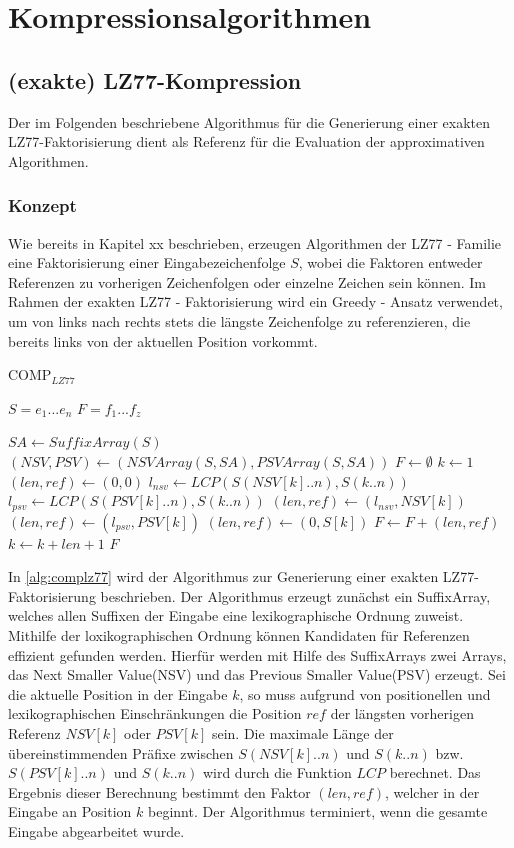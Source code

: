 \chapter{Kompressionsalgorithmen}

\section{(exakte) LZ77-Kompression}
Der im Folgenden beschriebene Algorithmus für die Generierung einer exakten LZ77-Faktorisierung dient als Referenz für die Evaluation der approximativen Algorithmen.

\subsection{Konzept}
Wie bereits in Kapitel xx beschrieben, erzeugen Algorithmen der LZ77 - Familie eine Faktorisierung einer Eingabezeichenfolge $S$, wobei die Faktoren entweder Referenzen
zu vorherigen Zeichenfolgen oder einzelne Zeichen sein können. Im Rahmen der exakten LZ77 - Faktorisierung wird ein Greedy - Ansatz verwendet, um von links nach rechts 
stets die längste Zeichenfolge zu referenzieren, die bereits links von der aktuellen Position vorkommt.
\begin{algorithm}[ht]
\centering
\caption{COMP$_{LZ77}$} \label{alg:complz77}
\algorithmicrequire $S=e_1...e_n$
\algorithmicensure $F=f_1...f_z$
\begin{algorithmic}
    \STATE $SA \gets SuffixArray(S)$
    \STATE $(NSV, PSV) \gets (NSVArray(S, SA), PSVArray(S, SA))$
    \STATE $F \gets \emptyset$
    \STATE $k \gets 1$
    \STATE $(len, ref) \gets (0, 0)$
    \STATE $l_{nsv} \gets LCP(S(NSV[k]..n), S(k..n))$
    \STATE $l_{psv} \gets LCP(S(PSV[k]..n), S(k..n))$
        \STATE $(len, ref) \gets (l_{nsv}, NSV[k])$
        \STATE $(len, ref) \gets (l_{psv}, PSV[k])$
    \ELSE
        \STATE $(len, ref) \gets (0, S[k])$
    \ENDIF
    \STATE $F \gets F + (len, ref)$
    \STATE $k \gets k + len + 1$
    \ENDWHILE
    \RETURN $F$
\end{algorithmic}
\end{algorithm}
In \ref{alg:complz77} wird der Algorithmus zur Generierung einer exakten LZ77-Faktorisierung beschrieben. Der Algorithmus erzeugt zunächst ein SuffixArray, welches allen
Suffixen der Eingabe eine lexikographische Ordnung zuweist. Mithilfe der loxikographischen Ordnung können Kandidaten für Referenzen effizient gefunden werden. Hierfür 
werden mit Hilfe des SuffixArrays zwei Arrays, das Next Smaller Value(NSV) und das Previous Smaller Value(PSV) erzeugt. Sei die aktuelle Position in der Eingabe $k$, so
muss aufgrund von positionellen und lexikographischen Einschränkungen die Position $ref$ der längsten vorherigen Referenz $NSV[k]$ oder $PSV[k]$ sein. Die maximale
Länge der übereinstimmenden Präfixe zwischen $S(NSV[k]..n)$ und $S(k..n)$ bzw. $S(PSV[k]..n)$ und $S(k..n)$ wird durch die Funktion $LCP$ berechnet. Das Ergebnis
dieser Berechnung bestimmt den Faktor $(len, ref)$, welcher in der Eingabe an Position $k$ beginnt. Der Algorithmus terminiert, wenn die gesamte Eingabe abgearbeitet wurde.

